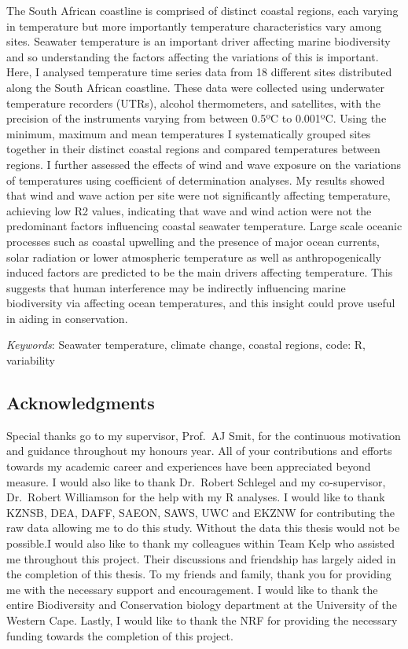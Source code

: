 \documentclass[12pt,a4paper,]{article}
\begin{document}
The South African coastline is comprised of distinct coastal regions,
each varying in temperature but more importantly temperature
characteristics vary among sites. Seawater temperature is an important
driver affecting marine biodiversity and so understanding the factors
affecting the variations of this is important. Here, I analysed
temperature time series data from 18 different sites distributed along
the South African coastline. These data were collected using underwater
temperature recorders (UTRs), alcohol thermometers, and satellites, with
the precision of the instruments varying from between 0.5ºC to 0.001ºC.
Using the minimum, maximum and mean temperatures I systematically
grouped sites together in their distinct coastal regions and compared
temperatures between regions. I further assessed the effects of wind and
wave exposure on the variations of temperatures using coefficient of
determination analyses. My results showed that wind and wave action per
site were not significantly affecting temperature, achieving low R2
values, indicating that wave and wind action were not the predominant
factors influencing coastal seawater temperature. Large scale oceanic
processes such as coastal upwelling and the presence of major ocean
currents, solar radiation or lower atmospheric temperature as well as
anthropogenically induced factors are predicted to be the main drivers
affecting temperature. This suggests that human interference may be
indirectly influencing marine biodiversity via affecting ocean
temperatures, and this insight could prove useful in aiding in
conservation.

\emph{Keywords}: Seawater temperature, climate change, coastal regions,
code: R, variability

\newpage

\hypertarget{acknowledgments}{%
\subsection{Acknowledgments}\label{acknowledgments}}

Special thanks go to my supervisor, Prof.~AJ Smit, for the continuous
motivation and guidance throughout my honours year. All of your
contributions and efforts towards my academic career and experiences
have been appreciated beyond measure. I would also like to thank
Dr.~Robert Schlegel and my co-supervisor, Dr.~Robert Williamson for the
help with my R analyses. I would like to thank KZNSB, DEA, DAFF, SAEON,
SAWS, UWC and EKZNW for contributing the raw data allowing me to do this
study. Without the data this thesis would not be possible.I would also
like to thank my colleagues within Team Kelp who assisted me throughout
this project. Their discussions and friendship has largely aided in the
completion of this thesis. To my friends and family, thank you for
providing me with the necessary support and encouragement. I would like
to thank the entire Biodiversity and Conservation biology department at
the University of the Western Cape. Lastly, I would like to thank the
NRF for providing the necessary funding towards the completion of this
project.
\end{document}
